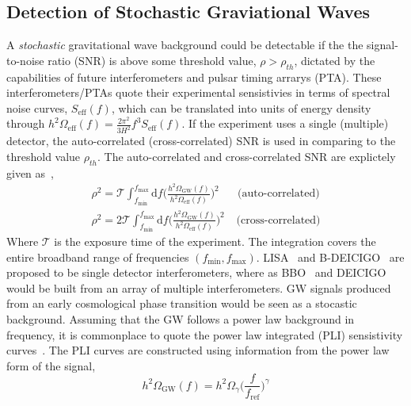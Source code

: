 \documentclass[nofootinbib,twocolumn,preprintnumbers]{revtex4-1}
\begin{document}
\subsection{Detection of Stochastic Graviational Waves}
\label{sec:detection}
A \textit{stochastic} gravitational wave background could be detectable if the the signal-to-noise ratio (SNR) is above some threshold value, $\rho > \rho_{th}$, dictated by the capabilities of future interferometers and pulsar timing arrarys (PTA). These interferometers/PTAs quote their experimental sensistivies in terms of spectral noise curves, $S_{\textrm{eff}}(f)$, which can be translated into units of energy density through $h^2 \Omega_{\textrm{eff}}(f) = \frac{2\pi^2}{3H^2}f^3 S_{\textrm{eff}}(f)$. If the experiment uses a single (multiple) detector, the auto-correlated (cross-correlated) SNR is used in comparing to the threshold value $\rho_{th}$. The auto-correlated and cross-correlated SNR are explictely given as~\cite{PhysRevD.59.102001},
\begin{equation}\label{eqn::SNR}
\begin{split}
\rho^2 =  \mathcal{T} \int_{f_{\textrm{min}}}^{f_{\textrm{max}}}\textrm{d}f \bigg( \frac{h^2 \Omega_{\textrm{GW}}(f)}{h^2 \Omega_{\textrm{eff}}(f)} \bigg)^2 \;\;\;\;\;\; \textrm{(auto-correlated)}
\\
\rho^2 = 2 \mathcal{T} \int_{f_{\textrm{min}}}^{f_{\textrm{max}}}\textrm{d}f \bigg( \frac{h^2 \Omega_{\textrm{GW}}(f)}{h^2 \Omega_{\textrm{eff}}(f)} \bigg)^2 \;\;\;\: \textrm{(cross-correlated)}
\end{split}
\end{equation}
Where $\mathcal{T}$ is the exposure time of the experiment. The integration covers the entire broadband range of frequencies $(f_{\textrm{min}}, f_{\textrm{max}})$. LISA~\citep{Audley:2017drz} and B-DEICIGO~\citep{10.1093/ptep/pty078} are proposed to be single detector interferometers, where as BBO~\citep{PhysRevD.72.083005} and DEICIGO~\citep{Sato_2017} would be built from an array of multiple interferometers.
GW signals produced from an early cosmological phase transition would be seen as a stocastic background. Assuming that the GW follows a power law background in frequency, it is commonplace to quote the power law integrated (PLI) sensistivity curves~\cite{PhysRevD.88.124032}. The PLI curves are constructed using information from the power law form of the signal,
\begin{equation}
h^2 \Omega_{\textrm{GW}}(f) = h^2 \Omega_{\gamma}  \bigg(\frac{f}{f_{\textrm{ref}}}\bigg)^{\gamma}
\end{equation}
\end{document}

